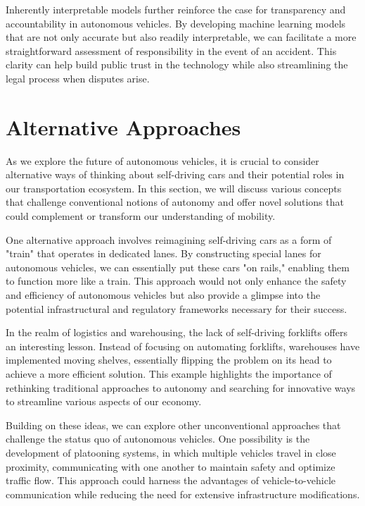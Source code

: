 Inherently interpretable models further reinforce the case for transparency and accountability in autonomous vehicles. By developing machine learning models that are not only accurate but also readily interpretable, we can facilitate a more straightforward assessment of responsibility in the event of an accident. This clarity can help build public trust in the technology while also streamlining the legal process when disputes arise.

\section{Alternative Approaches}

As we explore the future of autonomous vehicles, it is crucial to consider alternative ways of thinking about self-driving cars and their potential roles in our transportation ecosystem. In this section, we will discuss various concepts that challenge conventional notions of autonomy and offer novel solutions that could complement or transform our understanding of mobility.

One alternative approach involves reimagining self-driving cars as a form of "train" that operates in dedicated lanes. By constructing special lanes for autonomous vehicles, we can essentially put these cars "on rails," enabling them to function more like a train. This approach would not only enhance the safety and efficiency of autonomous vehicles but also provide a glimpse into the potential infrastructural and regulatory frameworks necessary for their success.

In the realm of logistics and warehousing, the lack of self-driving forklifts offers an interesting lesson. Instead of focusing on automating forklifts, warehouses have implemented moving shelves, essentially flipping the problem on its head to achieve a more efficient solution. This example highlights the importance of rethinking traditional approaches to autonomy and searching for innovative ways to streamline various aspects of our economy.

Building on these ideas, we can explore other unconventional approaches that challenge the status quo of autonomous vehicles. One possibility is the development of platooning systems, in which multiple vehicles travel in close proximity, communicating with one another to maintain safety and optimize traffic flow. This approach could harness the advantages of vehicle-to-vehicle communication while reducing the need for extensive infrastructure modifications.

